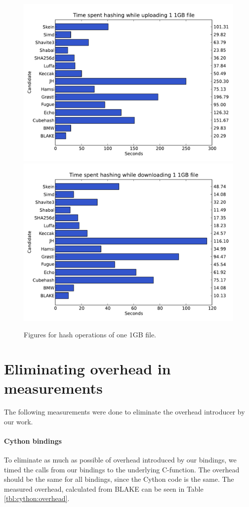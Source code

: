 \documentclass[english,12pt,a4paper]{book}
\begin{document}
\begin{figure}[h!]
    \centering
    \includegraphics[width=0.9\columnwidth]
        {graphs/Timespenthashingwhileuploading11GBfile.pdf}
    \includegraphics[width=0.9\columnwidth]
        {graphs/Timespenthashingwhiledownloading11GBfile.pdf}
    \caption{Figures for hash operations of one 1GB file.}
    \label{fig:graph:11gb}
\end{figure}

\section{Eliminating overhead in measurements}
The following measurements were done to eliminate the overhead introducer by
our work.

\paragraph{Cython bindings}
To eliminate as much as possible of overhead introduced by our bindings, we
timed the calls from our bindings to the underlying C-function. The overhead
should be the same for all bindings, since the Cython code is the same. The
measured overhead, calculated from BLAKE can be seen in Table
\ref{tbl:cython:overhead}.
\end{document}
